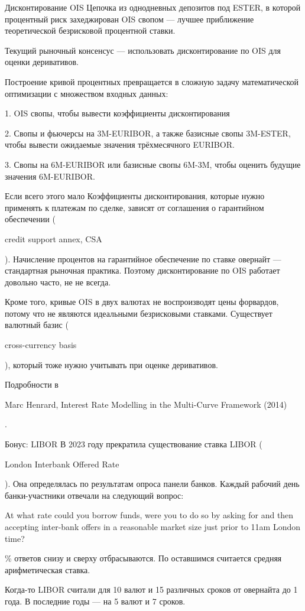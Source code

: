 \documentclass{beamer}
\newcommand{\en}[1]{\begin{otherlanguage}{english}#1\end{otherlanguage}}
\begin{document}
\begin{frame}{Дисконтирование OIS}
\justify
Цепочка из однодневных депозитов под ESTER, в которой процентный риск захеджирован OIS свопом --- лучшее приближение теоретической безрисковой процентной ставки.

\justify
Текущий рыночный консенсус --- использовать дисконтирование по OIS для оценки деривативов.

\justify
Построение кривой процентных превращается в сложную задачу математической оптимизации с множеством входных данных:

1. OIS свопы, чтобы вывести коэффициенты дисконтирования

2. Свопы и фьючерсы на 3M-EURIBOR, а также базисные свопы 3M-ESTER, чтобы вывести ожидаемые значения трёхмесячного EURIBOR.

3. Свопы на 6M-EURIBOR или базисные свопы 6M-3M, чтобы оценить будущие значения 6M-EURIBOR.
\end{frame}



\begin{frame}{Если всего этого мало}
\justify
Коэффициенты дисконтирования, которые нужно применять к платежам по сделке, зависят от соглашения о гарантийном обеспечении (\en{credit support annex, CSA}). Начисление процентов на гарантийное обеспечение по ставке овернайт --- стандартная рыночная практика. Поэтому дисконтирование по OIS работает довольно часто, не не всегда.

\justify
Кроме того, кривые OIS в двух валютах не воспроизводят цены форвардов, потому что не являются идеальными безрисковыми ставками. Существует валютный базис (\en{cross-currency basis}), который тоже нужно учитывать при оценке деривативов.

\justify
Подробности в \en{Marc Henrard, Interest Rate Modelling in the Multi-Curve Framework (2014)}.
\end{frame}



\begin{frame}{Бонус: LIBOR}
\justify
В 2023 году прекратила существование ставка LIBOR (\en{London Interbank Offered Rate}). Она определялась по результатам опроса панели банков. Каждый рабочий день банки-участники отвечали на следующий вопрос:

\justify
\en{At what rate could you borrow funds, were you to do so by asking for and then accepting inter-bank offers in a reasonable market size just prior to 11am London time?}

\% ответов снизу и сверху отбрасываются. По оставшимся считается средняя арифметическая ставка.

\justify
Когда-то LIBOR считали для 10 валют и 15 различных сроков от овернайта до 1 года. В последние годы --- на 5 валют и 7 сроков.
\end{frame}
\end{document}

